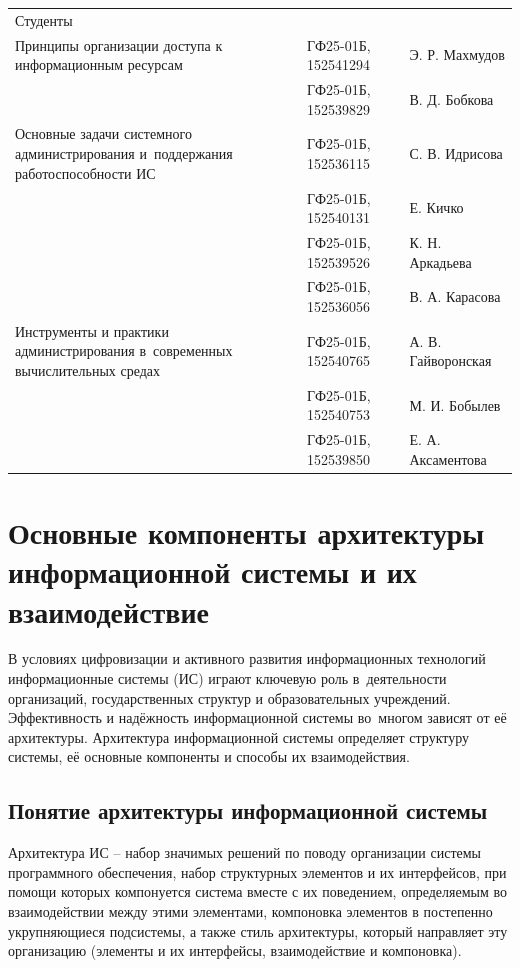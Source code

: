 \documentclass{ou}
\begin{document}
\begin{flushleft}
\doublespacing
\begin{tabularx}{\textwidth}{@{} p{} l l @{}}
Студенты     &                     &         \\
\multirow{-2.27}{\hsize}{\singlespacing Принципы организации доступа к информационным ресурсам}
             & ГФ25-01Б, 152541294 & Э. Р. Махмудов\\
             & ГФ25-01Б, 152539829 & В. Д. Бобкова\\
\multirow{-2.27}{\hsize}{\singlespacing Основные задачи системного администрирования и~поддержания работоспособности ИС}
             & ГФ25-01Б, 152536115 & С. В. Идрисова\\
             & ГФ25-01Б, 152540131 & Е. Кичко\\
             & ГФ25-01Б, 152539526 & К. Н. Аркадьева\\
             & ГФ25-01Б, 152536056 & В. А. Карасова\\
\multirow{-2.27}{\hsize}{\singlespacing Инструменты и практики администрирования в~современных вычислительных средах}
             & ГФ25-01Б, 152540765 & А. В. Гайворонская\\
             & ГФ25-01Б, 152540753 & М. И. Бобылев\\
             & ГФ25-01Б, 152539850 & Е. А. Аксаментова\\
\end{tabularx}
\end{flushleft}
\newpage
{
\sloppy
\tableofcontents
}
\newpage
\onehalfspacing
\section{Основные компоненты архитектуры информационной системы и их взаимодействие}
В условиях цифровизации и активного развития информационных технологий информационные системы (ИС) играют ключевую роль в~деятельности организаций, государственных структур и образовательных учреждений. Эффективность и надёжность информационной системы во~многом зависят от её архитектуры. Архитектура информационной системы определяет структуру системы, её основные компоненты и способы их взаимодействия.
\subsection{Понятие архитектуры информационной системы}
Архитектура ИС -- набор значимых решений по поводу организации системы программного обеспечения, набор структурных элементов и их интерфейсов, при помощи которых компонуется система вместе с их поведением, определяемым во взаимодействии между этими элементами, компоновка элементов в постепенно укрупняющиеся подсистемы, а также стиль архитектуры, который направляет эту организацию (элементы и их интерфейсы, взаимодействие и компоновка)\cite{kazan2023}.
\end{document}
